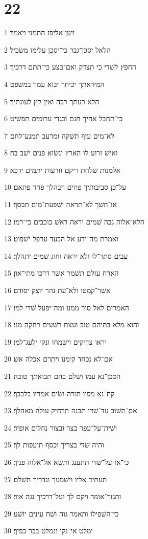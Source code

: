 \chapter{22}

\par 1 ויען אליפז התמני ויאמר׃
\par 2 הלאל יסכן־גבר כי־יסכן עלימו משׂכיל׃
\par 3 החפץ לשׁדי כי תצדק ואם־בצע כי־תתם דרכיך׃
\par 4 המיראתך יכיחך יבוא עמך במשׁפט׃
\par 5 הלא רעתך רבה ואין־קץ לעונתיך׃
\par 6 כי־תחבל אחיך חנם ובגדי ערומים תפשׁיט׃
\par 7 לא־מים עיף תשׁקה ומרעב תמנע־לחם׃
\par 8 ואישׁ זרוע לו הארץ ונשׂוא פנים ישׁב בה׃
\par 9 אלמנות שׁלחת ריקם וזרעות יתמים ידכא׃
\par 10 על־כן סביבותיך פחים ויבהלך פחד פתאם׃
\par 11 או־חשׁך לא־תראה ושׁפעת־מים תכסך׃
\par 12 הלא־אלוה גבה שׁמים וראה ראשׁ כוכבים כי־רמו׃
\par 13 ואמרת מה־ידע אל הבעד ערפל ישׁפוט׃
\par 14 עבים סתר־לו ולא יראה וחוג שׁמים יתהלך׃
\par 15 הארח עולם תשׁמר אשׁר דרכו מתי־און׃
\par 16 אשׁר־קמטו ולא־עת נהר יוצק יסודם׃
\par 17 האמרים לאל סור ממנו ומה־יפעל שׁדי למו׃
\par 18 והוא מלא בתיהם טוב ועצת רשׁעים רחקה מני׃
\par 19 יראו צדיקים וישׂמחו ונקי ילעג־למו׃
\par 20 אם־לא נכחד קימנו ויתרם אכלה אשׁ׃
\par 21 הסכן־נא עמו ושׁלם בהם תבואתך טובה׃
\par 22 קח־נא מפיו תורה ושׂים אמריו בלבבך׃
\par 23 אם־תשׁוב עד־שׁדי תבנה תרחיק עולה מאהלך׃
\par 24 ושׁית־על־עפר בצר ובצור נחלים אופיר׃
\par 25 והיה שׁדי בצריך וכסף תועפות לך׃
\par 26 כי־אז על־שׁדי תתענג ותשׂא אל־אלוה פניך׃
\par 27 תעתיר אליו וישׁמעך ונדריך תשׁלם׃
\par 28 ותגזר־אומר ויקם לך ועל־דרכיך נגה אור׃
\par 29 כי־השׁפילו ותאמר גוה ושׁח עינים יושׁע׃
\par 30 ימלט אי־נקי ונמלט בבר כפיך׃

